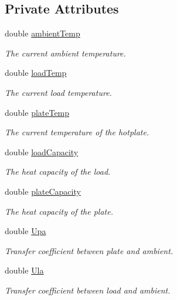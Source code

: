 \subsection*{Private Attributes}
\begin{DoxyCompactItemize}
\item 
double \mbox{\hyperlink{class_model_aca9e1c3383fa4fdd1107a0ad6432e7ee}{ambient\+Temp}}
\begin{DoxyCompactList}\small\item\em The current ambient temperature. \end{DoxyCompactList}\item 
double \mbox{\hyperlink{class_model_aaace2937872bd62f72c9f3d458c7f9b9}{load\+Temp}}
\begin{DoxyCompactList}\small\item\em The current load temperature. \end{DoxyCompactList}\item 
double \mbox{\hyperlink{class_model_ab2c61d4fb1ef5403adb9ab13e35918fd}{plate\+Temp}}
\begin{DoxyCompactList}\small\item\em The current temperature of the hotplate. \end{DoxyCompactList}\item 
double \mbox{\hyperlink{class_model_afc6cbef0a22dfc8fff87fde5d72cbef8}{load\+Capacity}}
\begin{DoxyCompactList}\small\item\em The heat capacity of the load. \end{DoxyCompactList}\item 
double \mbox{\hyperlink{class_model_afb7f9a5f30dd840632441178671b1a67}{plate\+Capacity}}
\begin{DoxyCompactList}\small\item\em The heat capacity of the plate. \end{DoxyCompactList}\item 
double \mbox{\hyperlink{class_model_aa90ed4603369e2af1fc311702854e6c5}{Upa}}
\begin{DoxyCompactList}\small\item\em Transfer coefficient between plate and ambient. \end{DoxyCompactList}\item 
double \mbox{\hyperlink{class_model_abe4d7709a1d0396475c057304311c3a2}{Ula}}
\begin{DoxyCompactList}\small\item\em Transfer coefficient between load and ambient. \end{DoxyCompactList}\item 

\end{DoxyCompactItemize}
